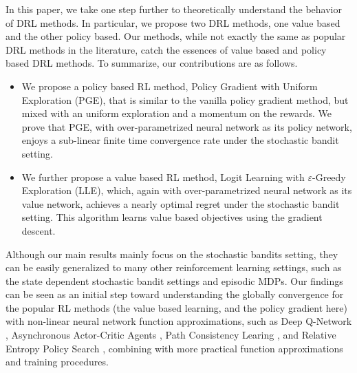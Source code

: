 In this paper, we take one step further to theoretically understand the behavior of DRL methods. In particular, we propose two DRL methods, one value based and the other policy based. Our methods, while not exactly the same as popular DRL methods in the literature, catch the essences of value based and policy based DRL methods. To summarize, our contributions are as follows.
\begin{itemize}
	\item We propose a policy based RL method, Policy Gradient with Uniform Exploration (PGE), that is similar to the vanilla policy gradient method, but mixed with an uniform exploration and a momentum on the rewards. We prove that PGE, with over-parametrized neural network as its policy network, enjoys a sub-linear finite time convergence rate under the stochastic bandit setting.
	\item We further propose a value based RL method, Logit Learning with $\varepsilon$-Greedy Exploration (LLE), which, again with over-parametrized neural network as its value network, achieves a nearly optimal regret under the stochastic bandit setting. This algorithm learns value based objectives using the gradient descent. 
\end{itemize}

Although our main results mainly focus on the stochastic bandits setting, they can be easily generalized to many other reinforcement learning settings, such as the state dependent stochastic bandit settings and episodic MDPs. Our findings can be seen as an initial step toward understanding the globally convergence for the popular RL methods (the value based learning, and the policy gradient here) with non-linear neural network function approximations, such as Deep Q-Network \cite{mnih2015human}, Asynchronous Actor-Critic Agents \citep{mnih2016asynchronous}, Path Consistency Learing \citep{nachum2017bridging}, and Relative Entropy Policy Search \citep{peters2010relative}, combining with more practical function approximations and training procedures.

